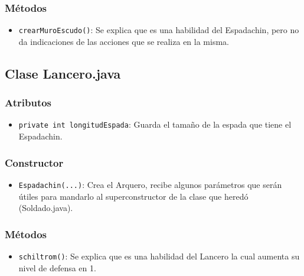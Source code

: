 \documentclass{article}
\begin{document}
\subsubsection{Métodos}
\begin{itemize}
        \item \texttt{crearMuroEscudo()}: Se explica que es una habilidad del Espadachin, pero no da indicaciones de las acciones que se realiza en la misma.
\end{itemize}



\newpage %

\subsection{Clase Lancero.java}

\subsubsection{Atributos}
\begin{itemize}
    \item \texttt{private int longitudEspada}: Guarda el tamaño de la espada que tiene el Espadachin.
\end{itemize}


\subsubsection{Constructor}
\begin{itemize}
    \item \texttt{Espadachin(...)}: Crea el Arquero, recibe algunos parámetros que serán útiles para mandarlo al superconstructor de la clase que heredó (Soldado.java).
\end{itemize}


\subsubsection{Métodos}
\begin{itemize}
        \item \texttt{schiltrom()}: Se explica que es una habilidad del Lancero la cual aumenta su nivel de defensa en 1.
\end{itemize}
\end{document}
